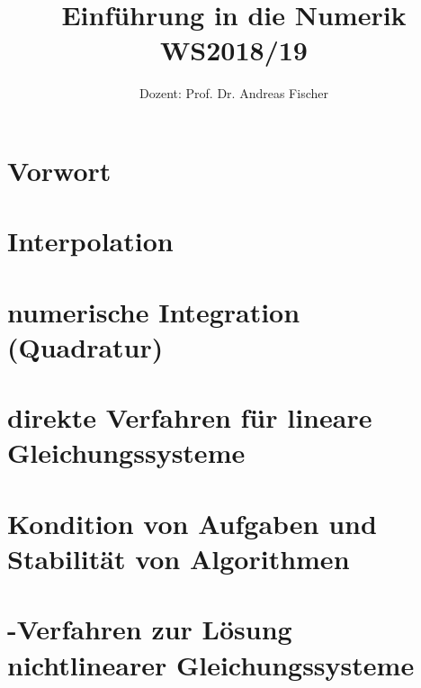 \documentclass[ngerman,a4paper,order=firstname,sectionreset]{../../texmf/tex/latex/mathscript/mathscript}
\title{\textbf{Einführung in die Numerik WS2018/19}}
\author{Dozent: Prof. Dr. Andreas Fischer}
\begin{document}
\pagestyle{plain}

\maketitle

\hypertarget{tocpage}{}
\tableofcontents
{}

\pagebreak
{}
\pagestyle{fancy}

\chapter*{Vorwort}


\chapter{Interpolation}




\chapter{numerische Integration (Quadratur)}






\chapter{direkte Verfahren für lineare Gleichungssysteme}





\chapter{Kondition von Aufgaben und Stabilität von Algorithmen}



\chapter{-Verfahren zur Lösung nichtlinearer Gleichungssysteme}


\end{document}
